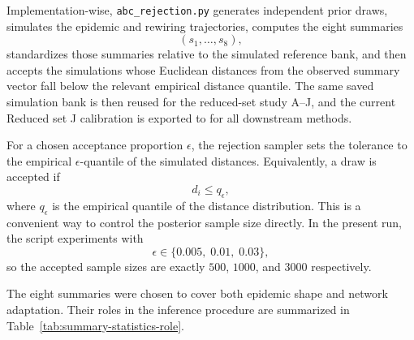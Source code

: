\documentclass[11pt]{article}
\begin{document}
Implementation-wise, \texttt{abc\_rejection.py} generates independent prior draws, simulates the epidemic and rewiring trajectories, computes the eight summaries
\[
(s_1,\ldots,s_8),
\]
standardizes those summaries relative to the simulated reference bank, and then accepts the simulations whose Euclidean distances from the observed summary vector fall below the relevant empirical distance quantile. The same saved simulation bank is then reused for the reduced-set study A--J, and the current Reduced set J calibration is exported to  for all downstream methods.

For a chosen acceptance proportion $\epsilon$, the rejection sampler sets the tolerance to the empirical $\epsilon$-quantile of the simulated distances. Equivalently, a draw is accepted if
\[
d_i \le q_{\epsilon},
\]
where $q_{\epsilon}$ is the empirical quantile of the distance distribution. This is a convenient way to control the posterior sample size directly. In the present run, the script experiments with
\[
\epsilon \in \{0.005,\; 0.01,\; 0.03\},
\]
so the accepted sample sizes are exactly $500$, $1000$, and $3000$ respectively.

The eight summaries were chosen to cover both epidemic shape and network adaptation. Their roles in the inference procedure are summarized in Table~\ref{tab:summary-statistics-role}.
\end{document}
